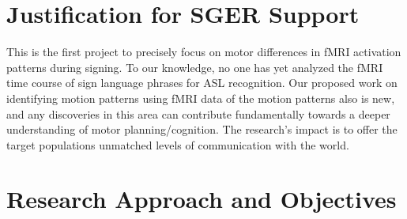 \documentclass{proposal}
\begin{document}


\section{Justification for SGER Support}

This is the first project to precisely focus on motor differences in fMRI activation patterns during signing. To our knowledge, no one has yet analyzed the fMRI time course of sign language phrases for ASL recognition.
Our proposed work on identifying motion patterns using fMRI
data of the motion patterns also is new, and any discoveries in this area can contribute fundamentally towards a deeper understanding of motor planning/cognition. The research's impact is to offer the target populations unmatched levels of communication with the world.


\section{Research Approach and Objectives}
\end{document}
